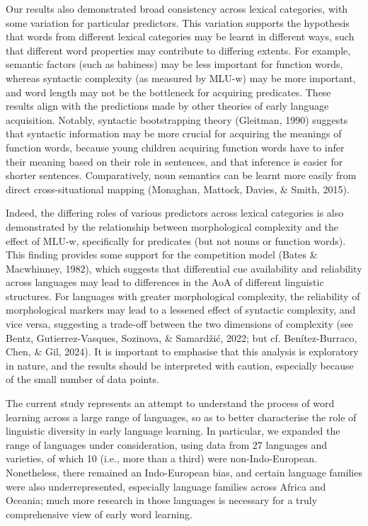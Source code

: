\documentclass[10pt, letterpaper]{article}
\begin{document}
Our results also demonstrated broad consistency across lexical
categories, with some variation for particular predictors. This
variation supports the hypothesis that words from different lexical
categories may be learnt in different ways, such that different word
properties may contribute to differing extents. For example, semantic
factors (such as babiness) may be less important for function words,
whereas syntactic complexity (as measured by MLU-w) may be more
important, and word length may not be the bottleneck for acquiring
predicates. These results align with the predictions made by other
theories of early language acquisition. Notably, syntactic bootstrapping
theory (Gleitman, 1990) suggests that syntactic information may be more
crucial for acquiring the meanings of function words, because young
children acquiring function words have to infer their meaning based on
their role in sentences, and that inference is easier for shorter
sentences. Comparatively, noun semantics can be learnt more easily from
direct cross-situational mapping (Monaghan, Mattock, Davies, \& Smith,
2015).

Indeed, the differing roles of various predictors across lexical
categories is also demonstrated by the relationship between
morphological complexity and the effect of MLU-w, specifically for
predicates (but not nouns or function words). This finding provides some
support for the competition model (Bates \& Macwhinney, 1982), which
suggests that differential cue availability and reliability across
languages may lead to differences in the AoA of different linguistic
structures. For languages with greater morphological complexity, the
reliability of morphological markers may lead to a lessened effect of
syntactic complexity, and vice versa, suggesting a trade-off between the
two dimensions of complexity (see Bentz, Gutierrez-Vasques, Sozinova, \&
Samardžić, 2022; but cf. Benítez-Burraco, Chen, \& Gil, 2024). It is
important to emphasise that this analysis is exploratory in nature, and
the results should be interpreted with caution, especially because of
the small number of data points.

The current study represents an attempt to understand the process of
word learning across a large range of languages, so as to better
characterise the role of linguistic diversity in early language
learning. In particular, we expanded the range of languages under
consideration, using data from 27 languages and varieties, of which 10
(i.e., more than a third) were non-Indo-European. Nonetheless, there
remained an Indo-European bias, and certain language families were also
underrepresented, especially language families across Africa and
Oceania; much more research in those languages is necessary for a truly
comprehensive view of early word learning.
\end{document}
